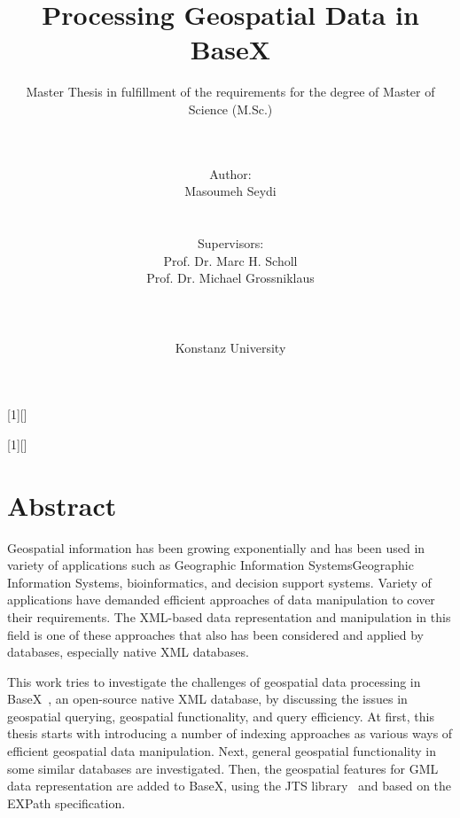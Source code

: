 \documentclass[a4paper,12pt]{article}
\title{Processing Geospatial Data in BaseX}
\subtitle{Master Thesis in fulfillment of the requirements for the degree of
Master of Science (M.Sc.)}
\author{\\\\Author: \\
	Masoumeh Seydi
	\\\\\\Supervisors: \\
	Prof. Dr. Marc H. Scholl \\
	Prof. Dr. Michael Grossniklaus\\ 
	\\\\\\
	Konstanz University}
\begin{document}
[1][]{
\lstset{#1}}{}

[1][]{
\lstset{#1}}{}


\renewcommand{\lstlistingname}{Code}


\maketitle
\thispagestyle{empty}

\newpage
\section*{Abstract}
Geospatial information has been growing exponentially and has been used in variety of applications 
such as Geographic Information SystemsGeographic Information Systems, bioinformatics, and decision support systems. 
Variety of applications have demanded efficient approaches of data manipulation to cover their requirements. 
The XML-based data representation and manipulation in this field is one of these approaches that also has been considered and applied by databases, especially native XML databases. 

This work tries to investigate the challenges of geospatial data processing in BaseX~\cite{www/basex}, an open-source native XML database, by discussing the issues in geospatial querying, geospatial functionality, and query efficiency. 
At first, this thesis starts with introducing a number of indexing approaches as various ways of efficient geospatial data manipulation. 
Next, general geospatial functionality in some similar databases are investigated. 
Then, the geospatial features for GML~\cite{gml} data representation are added to BaseX, 
using the JTS library~\cite{jts} and based on the EXPath specification.
\end{document}
